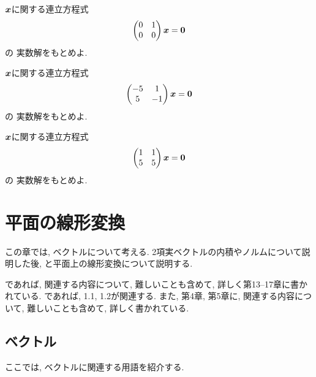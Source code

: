 \begin{quiz}
  \label{quiz:3:8}
  $\boldsymbol{x}$に関する連立方程式
  \begin{align*}
    \begin{pmatrix}0&1\\0&0\end{pmatrix}
      \boldsymbol{x}
      =\boldsymbol{0}
  \end{align*}
  の
  実数解をもとめよ.
\end{quiz}

\begin{quiz}
  \label{quiz:3:9}
  $\boldsymbol{x}$に関する連立方程式
  \begin{align*}
    \begin{pmatrix}-5&1\\5&-1\end{pmatrix}
      \boldsymbol{x}
      =\boldsymbol{0}
  \end{align*}
  の
  実数解をもとめよ.
\end{quiz}

\begin{quiz}
  \label{quiz:3:10}
  $\boldsymbol{x}$に関する連立方程式
  \begin{align*}
    \begin{pmatrix}1&1\\5&5\end{pmatrix}
      \boldsymbol{x}
      =\boldsymbol{0}
  \end{align*}
  の
  実数解をもとめよ.
\end{quiz}



  
\chapter{平面の線形変換}
\label{chap:lintrans}
この章では,
ベクトルについて考える.
2項実ベクトルの内積やノルムについて説明した後,
と平面上の線形変換について説明する.

\cite{978-4-7806-0772-7}であれば,
関連する内容について,
難しいことも含めて, 詳しく第13--17章に書かれている.
\cite{978-4-7806-0164-0}であれば,
1.1, 1.2が関連する.
また, 第4章, 第5章に, 
 関連する内容について, 難しいことも含めて, 詳しく書かれている.

\section{ベクトル}
ここでは, ベクトルに関連する用語を紹介する.

